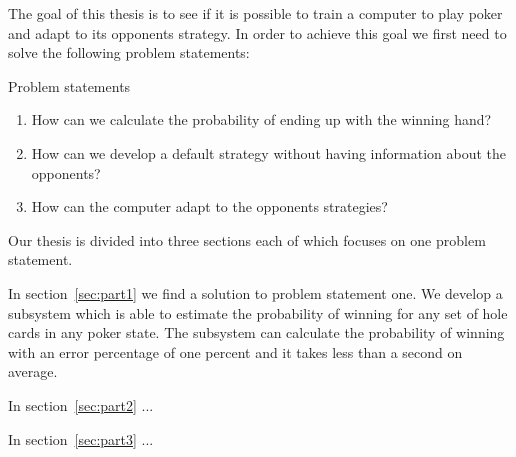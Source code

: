 The goal of this thesis is to see if it is possible to train a computer to play poker and adapt to its opponents strategy. In order to achieve this goal we first need to solve the following problem statements:


\vspace{4mm}
\begin{statementBox2}{Problem statements}
\begin{enumerate}
    \item \label{itm:q1} How can we calculate the probability of ending up with the winning hand? 
    \item \label{itm:q2} How can we develop a default strategy without having information about the opponents? 
    \item \label{itm:q3} How can the computer adapt to the opponents strategies?
  \end{enumerate}
\end{statementBox2}
\vspace{4mm}

Our thesis is divided into three sections each of which focuses on one problem statement.

In section~\ref{sec:part1} we find a solution to problem statement one. We develop a subsystem which is able to estimate the probability of winning for any set of hole cards in any poker state. The subsystem can calculate the probability of winning with an error percentage of one percent and it takes less than a second on average.

In section~\ref{sec:part2} ...

In section~\ref{sec:part3} ...
